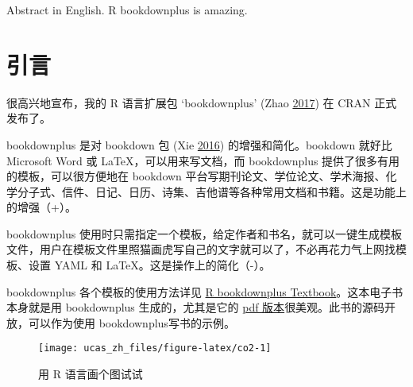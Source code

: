 \documentclass[doublesided]{Style/ucasthesis}%
\begin{document}
Abstract in English. R bookdownplus is amazing.




{%
\linespread{1.2}%
\tableofcontents%
\listoffigures%
\listoftables%
}
\mainmatter%
\mainmatter

\hypertarget{section}{%
\chapter{引言}\label{section}}

很高兴地宣布，我的 R 语言扩展包 `bookdownplus' (Zhao \protect\hyperlink{ref-R-bookdownplus}{2017}) 在 CRAN 正式发布了。

bookdownplus 是对 bookdown 包 (Xie \protect\hyperlink{ref-R-bookdown}{2016}) 的增强和简化。bookdown 就好比 Microsoft Word 或 LaTeX，可以用来写文档，而 bookdownplus 提供了很多有用的模板，可以很方便地在 bookdown 平台写期刊论文、学位论文、学术海报、化学分子式、信件、日记、日历、诗集、吉他谱等各种常用文档和书籍。这是功能上的增强（+）。

bookdownplus 使用时只需指定一个模板，给定作者和书名，就可以一键生成模板文件，用户在模板文件里照猫画虎写自己的文字就可以了，不必再花力气上网找模板、设置 YAML 和 LaTeX。这是操作上的简化（-）。

bookdownplus 各个模板的使用方法详见 \href{https://bookdown.org/baydap/bookdownplus}{R bookdownplus Textbook}。这本电子书本身就是用 bookdownplus 生成的，尤其是它的 \href{https://bookdown.org/baydap/bookdownplus/bookdownplus.pdf}{pdf 版本}很美观。此书的源码开放，可以作为使用 bookdownplus写书的示例。

\begin{figure}

{\centering \texttt{[image: ucas\_zh\_files/figure-latex/co2-1]} 

}

\caption{用 R 语言画个图试试}\label{fig:co2}
\end{figure}
\end{document}
